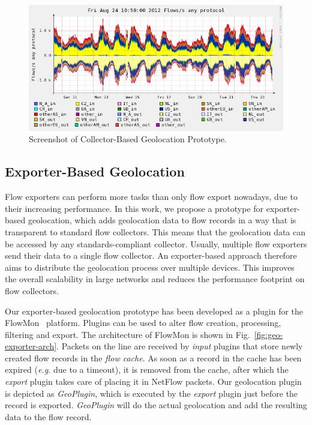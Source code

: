 \begin{figure}[!tb]
    \centering
    \includegraphics[width=\textwidth]{figures/paper-geolocation/nfgeodump.png}
    \caption{Screenshot of Collector-Based Geolocation Prototype.}
    \label{fig:geo-nfgeodump_screenshot}
\end{figure}

\subsection{Exporter-Based Geolocation} \label{subsec:geo-exporter_based_geolocation}

Flow exporters can perform more tasks than only flow export nowadays, due to their increasing performance. In this work, we propose a prototype for exporter-based geolocation, which adds geolocation data to flow records in a way that is transparent to standard flow collectors. This means that the geolocation data can be accessed by any standards-compliant collector. Usually, multiple flow exporters send their data to a single flow collector. An exporter-based approach therefore aims to distribute the geolocation process over multiple devices. This improves the overall scalability in large networks and reduces the performance footprint on flow collectors.

Our exporter-based geolocation prototype has been developed as a plugin for the FlowMon~\cite{FlowmonNetworks--Flowmon} platform. Plugins can be used to alter flow creation, processing, filtering and export. The architecture of FlowMon is shown in Fig.~\ref{fig:geo-exporter-arch}. Packets on the line are received by \textit{input} plugins that store newly created flow records in the \textit{flow cache}. As soon as a record in the cache has been expired (\textit{e.g.} due to a timeout), it is removed from the cache, after which the \textit{export} plugin takes care of placing it in NetFlow packets. Our geolocation plugin is depicted as \textit{GeoPlugin}, which is executed by the \textit{export} plugin just before the record is exported. \textit{GeoPlugin} will do the actual geolocation and add the resulting data to the flow record.

